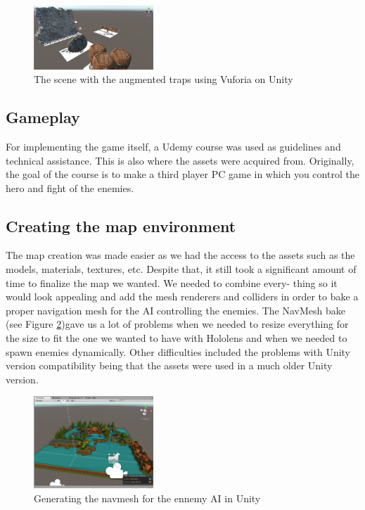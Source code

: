 \documentclass[sigchi, authorversion, screen]{acmart}
\begin{document}
\begin{figure}[ht]
  \includegraphics[width=0.4\textwidth]{traps.png}
  \caption{The scene with the augmented traps using Vuforia on Unity}
  \label{fig:traps}
\end{figure}

\subsection{Gameplay} 

For implementing the game itself, a Udemy course was used as guidelines and technical assistance. This is also where the assets were acquired from. Originally, the goal of the course is to make a third player PC game in which you control the hero and fight of the enemies.


\subsection{Creating the map environment}

The map creation was made easier as we had the access to the assets such as the models, materials, textures, etc. Despite that, it still took a significant amount of time to finalize the map we wanted. We needed to combine every- thing so it would look appealing and add the mesh renderers and colliders in order to bake a proper navigation mesh for the AI controlling the enemies. The NavMesh bake (see Figure \ref{fig:navmesh_unity})gave us a lot of problems when we needed to resize everything for the size to fit the one we wanted to have with Hololens and when we needed to spawn enemies dynamically. Other difficulties included the problems with Unity version compatibility being that the assets were used in a much older Unity version.


\begin{figure}
    \includegraphics[width=0.4\textwidth]{Images/map.png}
    \caption{Generating the navmesh for the ennemy AI in Unity}
    \label{fig:navmesh_unity}
\end{figure}
\end{document}
